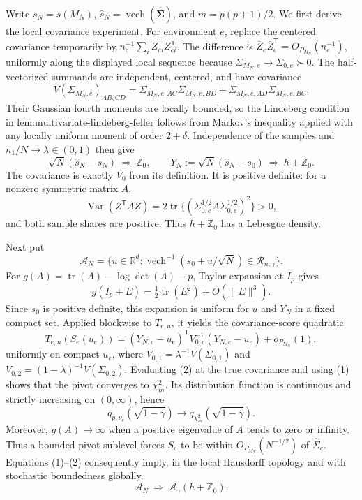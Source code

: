 Write \(s_N=s(M_N)\), \(\widehat s_N=\operatorname{vech}(\widehat{\boldsymbol\Sigma})\), and \(m=p(p+1)/2\).  We first derive the local covariance experiment.  For environment \(e\), replace the centered covariance temporarily by \(n_e^{-1}\sum_i Z_{ei}Z_{ei}^{\mathsf T}\).  The difference is \(\overline Z_e\overline Z_e^{\mathsf T}=O_{P_{M_N}}(n_e^{-1})\), uniformly along the displayed local sequence because \(\Sigma_{M_N,e}\to\Sigma_{0,e}\succ0\).  The half-vectorized summands are independent, centered, and have covariance
\[
 V(\Sigma_{M_N,e})_{AB,CD}
 =\Sigma_{M_N,e,AC}\Sigma_{M_N,e,BD}
  +\Sigma_{M_N,e,AD}\Sigma_{M_N,e,BC}.
\]
Their Gaussian fourth moments are locally bounded, so the Lindeberg condition in \(\text{lem:multivariate-lindeberg-feller}\) follows from Markov's inequality applied with any locally uniform moment of order \(2+\delta\).  Independence of the samples and \(n_1/N\to\lambda\in(0,1)\) then give
\[
 \sqrt N(\widehat s_N-s_N)\ \Rightarrow\ \mathbb Z_0,
 \qquad
 Y_N:=\sqrt N(\widehat s_N-s_0)\ \Rightarrow\ h+\mathbb Z_0.
 \tag{1}
\]
The covariance is exactly \(V_0\) from its definition.  It is positive definite: for a nonzero symmetric matrix \(A\),
\[
 \operatorname{Var}(Z^{\mathsf T}AZ)
 =2\operatorname{tr}\{(\Sigma_{0,e}^{1/2}A
             \Sigma_{0,e}^{1/2})^2\}>0,
\]
and both sample shares are positive.  Thus \(h+\mathbb Z_0\) has a Lebesgue density.

Next put
\[
 \mathcal A_N
 =\{u\in\mathbb R^d:
       \operatorname{vech}^{-1}(s_0+u/\sqrt N)
       \in\mathcal R_{n,\gamma}\}.
\]
For \(g(A)=\operatorname{tr}(A)-\log\det(A)-p\), Taylor expansion at \(I_p\) gives
\[
 g(I_p+E)=\tfrac12\operatorname{tr}(E^2)+O(\|E\|^3).
\]
Since \(s_0\) is positive definite, this expansion is uniform for \(u\) and \(Y_N\) in a fixed compact set.  Applied blockwise to \(T_{e,n}\), it yields the covariance-score quadratic
\[
 T_{e,n}(S_e(u_e))
 =(Y_{N,e}-u_e)^{\mathsf T}V_{0,e}^{-1}
          (Y_{N,e}-u_e)+o_{P_{M_N}}(1),
 \tag{2}
\]
uniformly on compact \(u_e\), where \(V_{0,1}=\lambda^{-1}V(\Sigma_{0,1})\) and \(V_{0,2}=(1-\lambda)^{-1}V(\Sigma_{0,2})\).  Evaluating (2) at the true covariance and using (1) shows that the pivot converges to \(\chi_m^2\).  Its distribution function is continuous and strictly increasing on \((0,\infty)\), hence
\[
 q_{p,\nu_e}(\sqrt{1-\gamma})
 \longrightarrow q_{\chi_m^2}(\sqrt{1-\gamma}).
\]
Moreover, \(g(A)\to\infty\) when a positive eigenvalue of \(A\) tends to zero or infinity.  Thus a bounded pivot sublevel forces \(S_e\) to be within \(O_{P_{M_N}}(N^{-1/2})\) of \(\widehat\Sigma_e\).  Equations (1)--(2) consequently imply, in the local Hausdorff topology and with stochastic boundedness globally,
\[
 \mathcal A_N\ \Rightarrow\
 \mathcal A_\gamma(h+\mathbb Z_0).
 \tag{3}
\]

